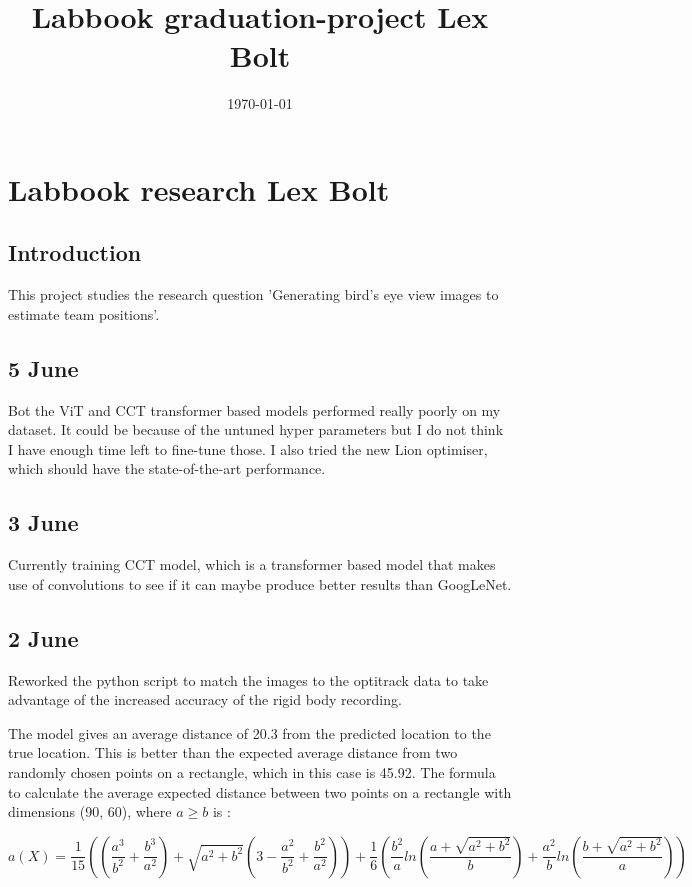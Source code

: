 \documentclass[twoside]{report}
\title{Labbook graduation-project Lex Bolt}
\date{\today}
\begin{document}
\chapter*{Labbook research Lex Bolt}

\section*{Introduction}
This project studies the research question 'Generating bird’s eye view images to estimate team positions'.

\section*{5 June}
Bot the ViT and CCT transformer based models performed really poorly on my dataset. It could be because of the untuned hyper parameters but I do not think I have enough time left to fine-tune those. I also tried the new Lion optimiser, which should have the state-of-the-art performance.

\section*{3 June}
Currently training CCT model, which is a transformer based model that makes use of convolutions to see if it can maybe produce better results than GoogLeNet. 

\section*{2 June}
Reworked the python script to match the images to the optitrack data to take advantage of the increased accuracy of the rigid body recording.

The model gives an average distance of 20.3 from the predicted location to the true location.
This is better than the expected average distance from two randomly chosen points on a rectangle, which in this case is 45.92.
The formula to calculate the average expected distance between two points on a rectangle with dimensions (90, 60), where $a \geq b$ is \cite{avgdistance}: 

\begin{equation}
a(X) = \frac{1}{15} \left(\left( \frac{a^3}{b^2} + \frac{b^3}{a^2}\right) + \sqrt{a^2 + b^2} \left(3 - \frac{a^2}{b^2} + \frac{b^2}{a^2}\right)\right) + \frac{1}{6}\left(\frac{b^2}{a} ln\left(\frac{a + \sqrt{a^2 + b^2}}{b}\right) + \frac{a^2}{b}ln\left(\frac{b + \sqrt{a^2 + b^2}}{a}\right)\right)
\end{equation}
\end{document}
